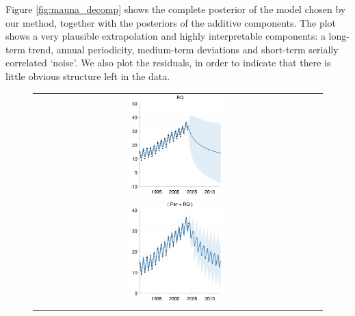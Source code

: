 \documentclass[twoside]{article}
\begin{document}
Figure \ref{fig:mauna_decomp} shows the complete posterior of the model chosen by our method, together with the posteriors of the additive components.
The plot shows a very plausible extrapolation and highly interpretable components: a long-term trend, annual periodicity, medium-term deviations and short-term serially correlated `noise'.  We also plot the residuals, in order to indicate that there is little obvious structure left in the data.

\begin{figure}[h!]
\centering
\newcommand{\wmg}{5.5cm}  %
\newcommand{\hmg}{4cm}  %
\begin{tabular}{c}
 \includegraphics[width=\wmg,height=\hmg]{../figures/decomposition/03-mauna2003-s_max_level_0/03-mauna2003-s_all_small} 
 \includegraphics[width=\wmg,height=\hmg]{../figures/decomposition/03-mauna2003-s_max_level_1/03-mauna2003-s_all_small}

\end{tabular}
\end{figure}
\end{document}
